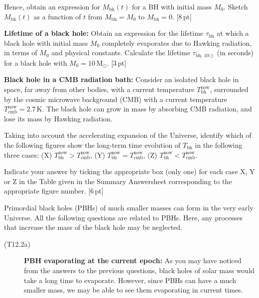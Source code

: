 \begin{description}
\begin{description}
    Hence, obtain an expression for $M_{\mathrm{bh}}(t)$ for a BH with initial
    mass $M_0$. Sketch $M_{\mathrm{bh}}(t)$ as a function of $t$ from
    $M_{\mathrm{bh}} = M_0$ to $M_{\mathrm{bh}} = 0$. \hfill[8\,pt]
  \item[(T12.1d)] \textbf{Lifetime of a black hole:} Obtain an expression for
    the lifetime $\tau_{\mathrm{bh}}$ at which a black hole with initial mass
    $M_0$ completely evaporates due to Hawking radiation, in terms of $M_0$
    and physical constants. Calculate the lifetime
    $\tau_{\mathrm{bh},\,10\odot}$ (in seconds) for a black hole with
    $M_0 = 10\,\mathrm{M}_\odot$. \hfill[3\,pt]
  \item[(T12.1e)] \textbf{Black hole in a CMB radiation bath:} Consider an
    isolated black hole in space, far away from other bodies, with a current
    temperature $T_{\mathrm{bh}}^{\mathrm{now}}$, surrounded by the cosmic
    microwave background (CMB) with a current temperature
    $T_{\mathrm{cmb}}^{\mathrm{now}} = 2.7$\,K. The black hole can grow in
    mass by absorbing CMB radiation, and lose its mass by Hawking radiation.

    Taking into account the accelerating expansion of the Universe, identify
    which of the following figures show the long-term time evolution of
    $T_{\mathrm{bh}}$ in the following three cases: (X)
    $T_{\mathrm{bh}}^{\mathrm{now}} > T_{\mathrm{cmb}}^{\mathrm{now}}$, (Y)
    $T_{\mathrm{bh}}^{\mathrm{now}} = T_{\mathrm{cmb}}^{\mathrm{now}}$, (Z)
    $T_{\mathrm{bh}}^{\mathrm{now}} < T_{\mathrm{cmb}}^{\mathrm{now}}$.


    Indicate your answer by ticking the appropriate box (only one) for each
    case X, Y or Z in the Table given in the Summary Answersheet corresponding
    to the appropriate figure number. \hfill[6\,pt]
  \end{description}
\item[(T12.2)] Primordial black holes (PBHs) of much smaller masses can form
  in the very early Universe. All the following questions are related to PBHs.
  Here, any processes that increase the mass of the black hole may be
  neglected.
  \begin{description}
  \item[(T12.2a)] \textbf{PBH evaporating at the current epoch:} As you may
    have noticed from the answers to the previous questions, black holes of
    solar mass would take a long time to evaporate. However, since PBHs can
    have a much smaller mass, we may be able to see them evaporating in
    current times.


\end{description}
\end{description}

